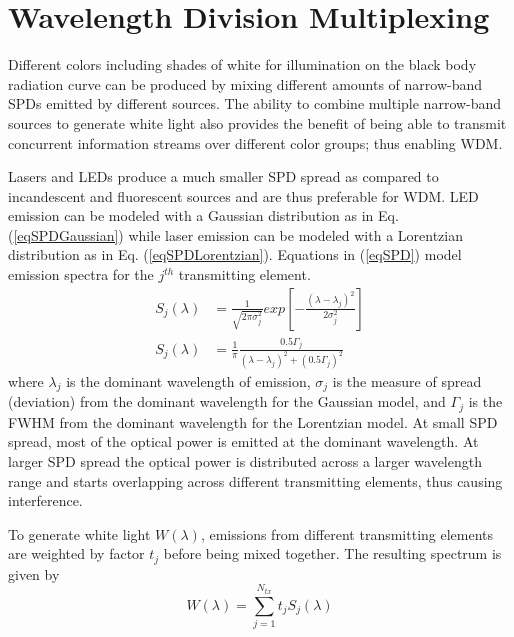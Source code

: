\section{Wavelength Division Multiplexing}\label{sec:wdm}
Different colors including shades of white for illumination on the black body radiation curve can be produced by mixing different amounts of narrow-band SPDs emitted by different sources. The ability to combine multiple narrow-band sources to generate white light also provides the benefit of being able to transmit concurrent information streams over different color groups; thus enabling WDM. 

Lasers and LEDs produce a much smaller SPD spread as compared to incandescent and fluorescent sources and are thus preferable for WDM. LED emission can be modeled with a Gaussian distribution as in Eq. (\ref{eqSPDGaussian}) while laser emission can be modeled with a Lorentzian distribution as in Eq. (\ref{eqSPDLorentzian}). Equations in (\ref{eqSPD}) model emission spectra for the $j^{th}$ transmitting element.
\begin{subequations}
\begin{align}
S_j(\lambda) &= \frac{1}{\sqrt{2\pi\sigma_j^2}}exp\left[-\frac{(\lambda-\lambda_j)^2}{2\sigma_j^2}\right]\label{eqSPDGaussian}\\
S_j(\lambda) &= \frac{1}{\pi}\frac{0.5\Gamma_j}{(\lambda-\lambda_j)^2 + (0.5\Gamma_j)^2}\label{eqSPDLorentzian}
\end{align}
\label{eqSPD}
\end{subequations}
where $\lambda_j$ is the dominant wavelength of emission, $\sigma_j$ is the measure of spread (deviation) from the dominant wavelength for the Gaussian model, and $\Gamma_j$ is the FWHM from the dominant wavelength for the Lorentzian model. At small SPD spread, most of the optical power is emitted at the dominant wavelength. At larger SPD spread the optical power is distributed across a larger wavelength range and starts overlapping across different transmitting elements, thus causing interference.

To generate white light $W(\lambda)$, emissions from different transmitting elements are weighted by factor $t_j$ before being mixed together. The resulting spectrum is given by
\begin{equation}
	\label{eqWhite}
	W(\lambda) = \sum_{j=1}^{N_{tx}}t_jS_j(\lambda)
\end{equation}

